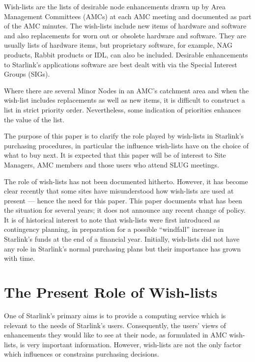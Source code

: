 Wish-lists are the lists of desirable node enhancements drawn
up by Area Management Committees (AMCs) at each AMC meeting and
documented as part of the AMC minutes.  The wish-lists include new items
of hardware and software and also replacements for worn out or obsolete
hardware and software.  They are usually lists of hardware items, but
proprietary software, for example, NAG products, Rabbit products or IDL, can
also be included.  Desirable enhancements to Starlink's applications software
are best dealt with via the Special Interest Groups (SIGs).
 
Where there are several Minor Nodes in an AMC's catchment area
and when the wish-list includes replacements as well as new items,
it is difficult to construct a list in strict priority order.
Nevertheless, some indication of priorities enhances the value of the list.
 
The purpose of this paper is to clarify the role played by wish-lists
in Starlink's purchasing procedures, in particular the influence wish-lists
have on the choice of what to buy next.  It is expected that this paper will
be of interest to Site Managers, AMC members and those users who attend
SLUG meetings.
 
The role of wish-lists has not been documented hitherto.  However, it has
become clear recently that some sites have misunderstood how wish-lists
are used at present --- hence
the need for this paper.  This paper documents what has been the situation for
several years; it does not announce any recent change of policy.  It is of
historical interest to note that wish-lists were first introduced as contingency
planning, in preparation for a possible ``windfall'' increase in Starlink's
funds at the end of a financial year.  Initially, wish-lists did not have any
role in Starlink's normal purchasing plans but their importance
has grown with time.
 
\section  {The Present Role of Wish-lists}

One of Starlink's primary aims is to provide a computing service
which is relevant
to the needs of Starlink's users.  Consequently, the users' views of
enhancements
they would like to see at their node, as formulated in AMC wish-lists,
is very important information.  However, wish-lists are not the only
factor which influences or constrains purchasing decisions.
 
